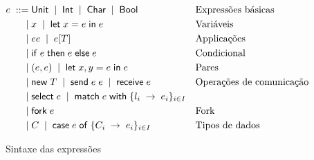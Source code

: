 \begin{figure}[ht]
  \begin{align*}
    e \; ::= \; & \mathsf{Unit} \;\mid\; \mathsf{Int} \;\mid\; \mathsf{Char} \;\mid\; \mathsf{Bool} && \text{Expressões básicas}\\
    \;\mid\; & x \;\mid\; \mathsf{let} \; x = e \; \mathsf{in} \; e && \text{Variáveis}\\
    \;\mid\; & ee \;\mid\; e[T] && \text{Applicações}\\
    \;\mid\; & \mathsf{if}\;e\;\mathsf{then}\;e\;\mathsf{else} \; e && \text{Condicional}\\
    \;\mid\; & (e,e) \;\mid\; \mathsf{let}\;x, y = e\;\mathsf{in}\;e && \text{Pares}\\
    \;\mid\; & \mathsf{new}\;T \;\mid\; \mathsf{send}\;e\; e \;\mid\; \mathsf{receive}\;e && \text{Operações de comunicação}\\
    \;\mid\; & \mathsf{select}\;e \;\mid\; \mathsf{match}\;e\;\mathsf{with}\;\{l_i\;\to\;e_i\}_{i\in I} \\
    \;\mid\; & \mathsf{fork}\;e  && \text{Fork}\\
    \;\mid\; & C \;\mid\; \mathsf{case}\;e\;\mathsf{of}\;\{C_i\;\to\;e_i\}_{i\in I} && \text{Tipos de dados}\\
  \end{align*}
  \hrulefill
  \caption{Sintaxe das expressões}
  \label{fig:expressions}
\end{figure}


